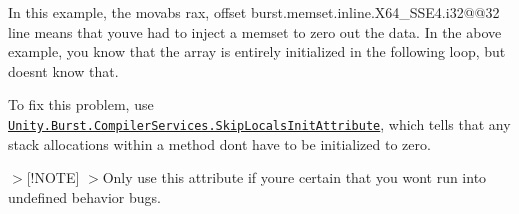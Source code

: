 \begin{DoxyCode}{0}

\end{DoxyCode}


In this example, the {\ttfamily movabs rax, offset burst.\+memset.\+inline.\+X64\+\_\+\+SSE4.\+i32@@32} line means that you\textquotesingle{}ve had to inject a memset to zero out the data. In the above example, you know that the array is entirely initialized in the following loop, but  doesn\textquotesingle{}t know that.

To fix this problem, use \href{xref:Unity.Burst.CompilerServices.SkipLocalsInitAttribute}{\texttt{ {\ttfamily Unity.\+Burst.\+Compiler\+Services.\+Skip\+Locals\+Init\+Attribute}}}, which tells  that any stack allocations within a method don\textquotesingle{}t have to be initialized to zero.

\texorpdfstring{$>$}{>}\mbox{[}!\+NOTE\mbox{]} \texorpdfstring{$>$}{>}Only use this attribute if you\textquotesingle{}re certain that you won\textquotesingle{}t run into undefined behavior bugs.

